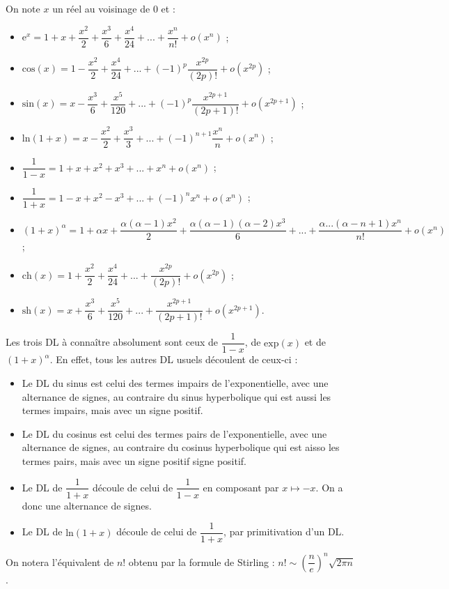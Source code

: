 \documentclass[a4paper,12pt]{book}
\begin{document}
\begin{tcolorbox}[colback=white,colframe=black,title=Développements limités]
On note $x$ un réel au voisinage de $0$ et :\begin{itemize}
    \item $\mathrm{e}^{x} = 1 + x + \dfrac{x^2}{2} + \dfrac{x^3}{6} + \dfrac{x^4}{24} + ... + \dfrac{x^n}{n!} + o(x^n)$ ;
    \item $\mathrm{cos}(x) = 1 - \dfrac{x^2}{2} + \dfrac{x^4}{24} + ... + (-1)^{p}\dfrac{x^{2p}}{(2p)!} + o(x^{2p})$ ;
    \item $\mathrm{sin}(x) = x - \dfrac{x^3}{6} + \dfrac{x^5}{120} + ... + (-1)^p\dfrac{x^{2p+1}}{(2p+1)!} + o(x^{2p+1})$ ;
    \item $\mathrm{ln}(1+x) = x - \dfrac{x^2}{2} + \dfrac{x^3}{3} + ... + (-1)^{n+1}\dfrac{x^n}{n} + o(x^n)$ ;
    \item $\dfrac{1}{1-x} = 1 + x + x^2 + x^3 + ... + x^n + o(x^n)$ ;
    \item $\dfrac{1}{1+x} = 1 - x + x^2 - x^3 + ... + (-1)^nx^n + o(x^n)$ ;
    \item $(1+x)^\alpha = 1 + \alpha x + \dfrac{\alpha(\alpha-1)x^2}{2} + \dfrac{\alpha(\alpha-1)(\alpha-2)x^3}{6} + ... + \dfrac{\alpha...(\alpha-n+1)x^n}{n!} + o(x^n)$ ;
    \item $\mathrm{ch}(x) = 1 + \dfrac{x^2}{2} + \dfrac{x^4}{24} + ... + \dfrac{x^{2p}}{(2p)!} + o(x^{2p})$ ;
    \item $\mathrm{sh}(x) = x + \dfrac{x^3}{6} + \dfrac{x^5}{120} + ... + \dfrac{x^{2p+1}}{(2p+1)!} + o(x^{2p+1})$.
\end{itemize}
Les trois DL à connaître absolument sont ceux de $\dfrac{1}{1-x}$, de $\mathrm{exp}(x)$ et de $(1+x)^\alpha$. En effet, tous les autres DL usuels découlent de ceux-ci :\begin{itemize}
    \item Le DL du sinus est celui des termes impairs de l'exponentielle, avec une alternance de signes, au contraire du sinus hyperbolique qui est aussi les termes impairs, mais avec un signe positif.
    \item Le DL du cosinus est celui des termes pairs de l'exponentielle, avec une alternance de signes, au contraire du cosinus hyperbolique qui est aisso les termes pairs, mais avec un signe positif signe positif.
    \item Le DL de $\dfrac{1}{1+x}$ découle de celui de $\dfrac{1}{1-x}$ en composant par $x\mapsto -x$. On a donc une alternance de signes.
    \item Le DL de $\mathrm{ln}(1+x)$ découle de celui de $\dfrac{1}{1+x}$, par primitivation d'un DL.
\end{itemize}
On notera l'équivalent de $n!$ obtenu par la formule de Stirling : $n!\sim \left(\dfrac{n}{e}\right)^n\sqrt{2\pi n}$.
\end{tcolorbox} 
    
\end{document}
